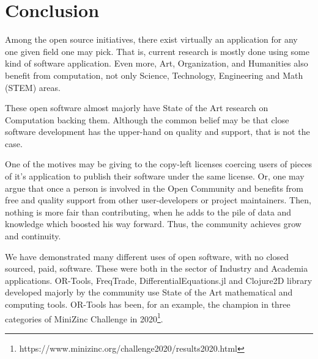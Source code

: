 \documentclass[
12pt,				%
openright,			%
oneside,			%
a4paper,			%
brazil,				%
english,			  %
]{abntex2}
\begin{document}
\chapter{Conclusion}
Among the open source initiatives, there exist virtually an
application for any one given field one may pick. That is, current
research is mostly done using some kind of software application. Even
more, Art, Organization, and Humanities also benefit from computation,
not only Science, Technology, Engineering and Math (STEM) areas.

These open software almost majorly have State of the Art research on
Computation backing them. Although the common belief may be that close
software development has the upper-hand on quality and support, that
is not the case.

One of the motives may be giving to the copy-left
licenses coercing users of pieces of it's application to publish their
software under the same license. Or, one may argue that once a person
is involved in the Open Community and benefits from free and quality
support from other user-developers or project maintainers. Then,
nothing is more fair than contributing, when he adds to the pile of
data and knowledge which boosted his way forward. Thus, the community
achieves grow and continuity.

We have demonstrated many different uses of open software, with no
closed sourced, paid, software. These were both in the sector of
Industry and Academia applications. OR-Tools, FreqTrade, DifferentialEquations.jl and Clojure2D library developed majorly by the community use State of the Art mathematical and computing tools. OR-Tools has been, for an example, the champion in three categories of MiniZinc Challenge in 2020\footnote{https://www.minizinc.org/challenge2020/results2020.html}.
\end{document}
